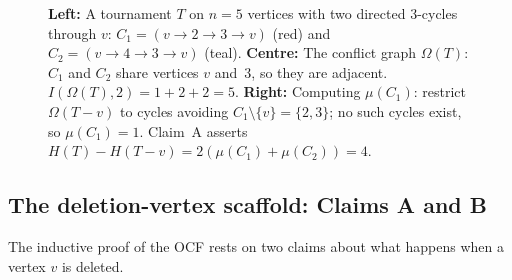 \documentclass[12pt,reqno]{amsart}
\theoremstyle{plain}
\theoremstyle{definition}
\theoremstyle{remark}
\begin{document}
\begin{figure}[htbp]
\caption{\textbf{Left:} A tournament $T$ on $n=5$ vertices with two directed
3-cycles through $v$: $C_1=(v{\to}2{\to}3{\to}v)$ (red) and
$C_2=(v{\to}4{\to}3{\to}v)$ (teal).
\textbf{Centre:} The conflict graph $\Omega(T)$: $C_1$ and $C_2$ share
vertices $v$ and~$3$, so they are adjacent. $I(\Omega(T),2)=1+2+2=5$.
\textbf{Right:} Computing $\mu(C_1)$: restrict $\Omega(T{-}v)$ to cycles
avoiding $C_1\setminus\{v\}=\{2,3\}$; no such cycles exist, so $\mu(C_1)=1$.
Claim~A asserts $H(T)-H(T{-}v)=2(\mu(C_1)+\mu(C_2))=4$.}
\label{fig:omega_example}
\end{figure}

\subsection{The deletion-vertex scaffold: Claims A and B}
\label{subsec:scaffold}

The inductive proof of the OCF rests on two claims about what happens when a
vertex $v$ is deleted.
\end{document}
